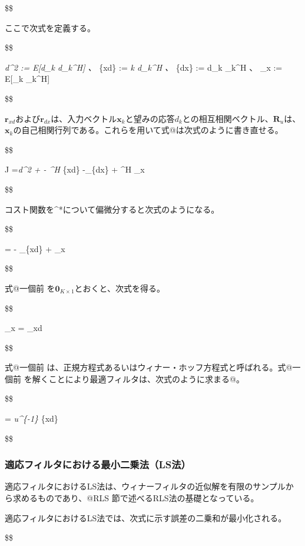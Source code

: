 \$\$

ここで次式を定義する。

\$\$

\sigma\emph{d\^{}2 := E{[}d\_k d\_k\^{}H{]} 、 }\{xd\} :=
\emph{k d\_k\^{}H 、 }\{dx\} := d\_k \_k\^{}H 、
\_x := E{[}\_k \_k\^{}H{]}

\$\$

\(\bm{r}_{xd}\)および\(\bm{r}_{dx}\)は、入力ベクトル\(\bm{x}_k\)と望みの応答\(d_k\)との相互相関ベクトル、\(\bm{R}_u\)は、\(\bm{x}_k\)の自己相関行列である。これらを用いて式@は次式のように書き直せる。

\$\$

J =\sigma\emph{d\^{}2 + - \^{}H }\{xd\} -\_\{dx\}
 + \^{}H \_x 

\$\$

コスト関数を\^{}*について偏微分すると次式のようになる。

\$\$

 = - \_\{xd\} + \_x

\$\$

式@一個前 を\(\bm{0}_{K \times 1}\)とおくと、次式を得る。

\$\$

\_x  = \_xd

\$\$

式@一個前
は、正規方程式あるいはウィナー・ホッフ方程式と呼ばれる。式@一個前
を解くことにより最適フィルタは、次式のように求まる@。

\$\$

 = \emph{u\^{}\{-1\} }\{xd\}

\$\$

\hypertarget{ux9069ux5fdcux30d5ux30a3ux30ebux30bfux306bux304aux3051ux308bux6700ux5c0fux4e8cux4e57ux6cd5lsux6cd5}{%
\subsubsection{適応フィルタにおける最小二乗法（LS法）}\label{ux9069ux5fdcux30d5ux30a3ux30ebux30bfux306bux304aux3051ux308bux6700ux5c0fux4e8cux4e57ux6cd5lsux6cd5}}

適応フィルタにおけるLS法は、ウィナーフィルタの近似解を有限のサンプルから求めるものであり、@RLS
節で述べるRLS法の基礎となっている。

適応フィルタにおけるLS法では、次式に示す誤差の二乗和が最小化される。

\$\$

